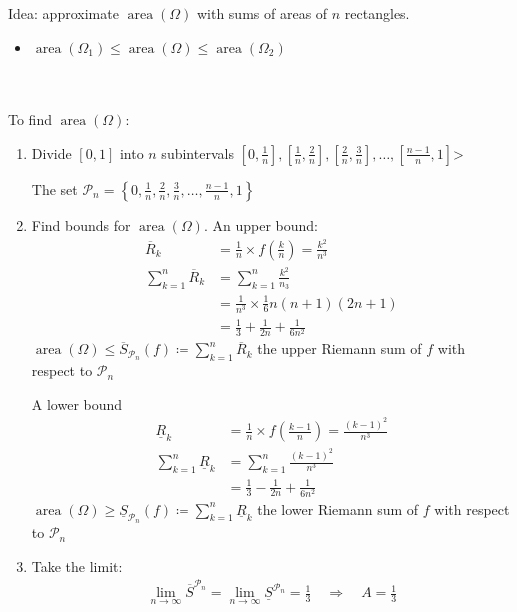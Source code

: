 \documentclass{report}
\DeclareMathOperator{\area}{area}
\begin{document}
			Idea: approximate $\operatorname{area}(\Omega)$ with sums of areas of $n$ rectangles.
			\begin{itemize}
				\item $\area(\Omega_1) \leq \operatorname{area}(\Omega) \leq \area(\Omega_2)$
			\end{itemize}
			\\ \\
			To find $\area(\Omega)$:
			\begin{enumerate}
				\item Divide $[0,1]$ into $n$ subintervals $\left[0,\frac{1}{n}\right], \left[\frac{1}{n}, \frac{2}{n}\right], \left[\frac{2}{n}, \frac{3}{n}\right], \dots, \left[\frac{n-1}{n}, 1\right]$>

					The set $\mathcal{P}_n = \left\{0, \frac{1}{n}, \frac{2}{n}, \frac{3}{n}, \dots, \frac{n-1}{n}, 1\right\}$
				\item Find bounds for $\area(\Omega)$.
					An upper bound:
					\begin{align*}
						\overline{R}_k &= \frac{1}{n} \times f(\frac{k}{n}) = \frac{k^2}{n^3}	\\
						\sum_{k=1}^n \overline{R}_k &= \sum_{k=1}^n \frac{k^2}{n_3}	\\
													&= \frac{1}{n^3} \times \frac{1}{6} n (n+1) (2n+1)	\\
													&= \frac{1}{3} + \frac{1}{2n} + \frac{1}{6n^2}
					\end{align*}
					$\area(\Omega) \leq \overline{S}_{\mathcal{P}_n}(f) \coloneq \displaystyle\sum_{k=1}^n \overline{R}_k$ the upper Riemann sum of $f$ with respect to $\mathcal{P}_n$

					A lower bound
					\begin{align*}
						\underline{R}_k &= \frac{1}{n} \times f(\frac{k-1}{n}) = \frac{(k-1)^2}{n^3}		\\
						\sum_{k=1}^n \underline{R}_k &= \sum_{k=1}^n \frac{(k-1)^2}{n^3}		\\
													 &= \frac{1}{3} - \frac{1}{2n} + \frac{1}{6n^2}
					\end{align*}
					$\area(\Omega) \geq \underline{S}_{\mathcal{P}_n} (f) \coloneq \displaystyle\sum_{k=1}^n \underline{R}_k$ the lower Riemann sum of $f$ with respect to $\mathcal{P}_n$
				\item Take the limit:
					\begin{align*}
						\lim_{n\to \infty} \overline{S}^{\mathcal{P}_n} = \lim_{n\to \infty} \underline{S}^{\mathcal{P}_n} = \frac{1}{3} \quad \Longrightarrow \quad A = \frac{1}{3}
					\end{align*}
			\end{enumerate}
\end{document}
